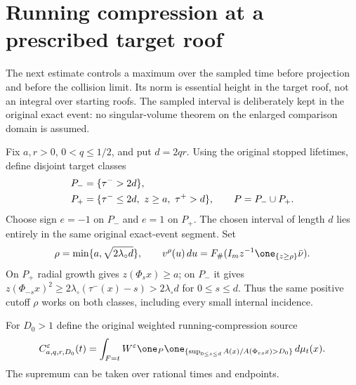 \section{Running compression at a prescribed target roof}
\label{sec:v97-running}
The next estimate controls a maximum over the sampled time before
projection and before the collision limit. Its norm is essential
height in the target roof, not an integral over starting roofs.
The sampled interval is deliberately kept in the original exact event:
no singular-volume theorem on the enlarged comparison domain is assumed.

Fix $a,r>0$, $0<q\le1/2$, and put $d=2qr$. Using the original
stopped lifetimes, define disjoint target classes
\begin{align}
 P_-&=\{\tau^->2d\},\notag\\
 P_+&=\{\tau^-\le2d,\ z\ge a,\ \tau^+>d\},\qquad P=P_-\cup P_+.
                                      \label{eq:v97-protected}
\end{align}
Choose sign $e=-1$ on $P_-$ and $e=1$ on $P_+$. The chosen interval
of length $d$ lies entirely in the same original exact-event segment.
Set
\[
 \rho=\min\{a,\sqrt{2\lambda_\circ d}\},\qquad
 v^\rho(u)\,du=F_\#(I_mz^{-1}\one_{\{z\ge\rho\}}\bar\nu).
\]
On $P_+$ radial growth gives $z(\Phi_sx)\ge a$; on $P_-$ it gives
$z(\Phi_{-s}x)^2\ge2\lambda_\circ(\tau^-(x)-s)>2\lambda_\circ d$
for $0\le s\le d$. Thus the same positive cutoff $\rho$ works on
both classes, including every small internal incidence.

For $D_0>1$ define the original weighted running-compression source
\begin{equation}\label{eq:v97-running-source}
 C_{a,q,r,D_0}^\varepsilon(t)=
 \int_{F=t}W^\varepsilon\one_P
 \one_{\{\sup_{0\le s\le d}A(x)/A(\Phi_{es}x)>D_0\}}\,d\mu_t(x).
\end{equation}
The supremum can be taken over rational times and endpoints.

